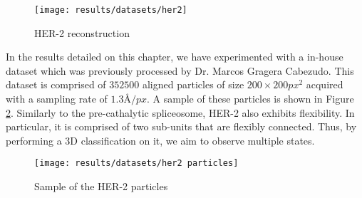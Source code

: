 \documentclass[../main.tex]{subfiles}
\begin{document}
\begin{figure}[htbp]
    \centering
    \texttt{[image: results/datasets/her2]}
    \caption{HER-2 reconstruction}
    \label{fig:5.1:her2}
\end{figure}

In the results detailed on this chapter, we have experimented with a in-house dataset which was previously processed by Dr. Marcos Gragera Cabezudo. This dataset is comprised of $352500$ aligned particles of size $200 \times 200 \si{px^2}$ acquired with a sampling rate of $1.3 \si{\angstrom/px}$. A sample of these particles is shown in Figure \ref{fig:5.1:her2_particles}. Similarly to the pre-cathalytic spliceosome, HER-2 also exhibits flexibility. In particular, it is comprised of two sub-units that are flexibly connected. Thus, by performing a 3D classification on it, we aim to observe multiple states.

\begin{figure}[htbp]
    \centering
    \texttt{[image: results/datasets/her2 particles]}
    \caption{Sample of the HER-2 particles}
    \label{fig:5.1:her2_particles}
\end{figure}
\end{document}
